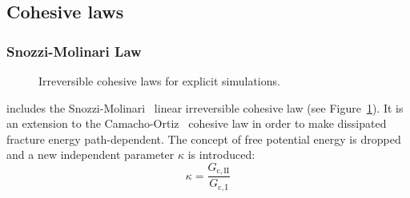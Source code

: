 \subsection{Cohesive laws}
\label{sec:cohesive-laws}

\subsubsection{Snozzi-Molinari Law}
\begin{figure}[!hbt]
  \centering
  \qquad
  \caption{Irreversible cohesive laws for explicit simulations.}
  \label{fig:smm:coh:linear_cohesive_law}
\end{figure}

\akantu includes the Snozzi-Molinari~\cite{snozzi_cohesive_2013}
linear irreversible cohesive law (see
Figure~\ref{fig:smm:coh:linear_cohesive_law}). It is an extension to
the Camacho-Ortiz~\cite{camacho_computational_1996} cohesive law in
order to make dissipated fracture energy path-dependent. The concept
of free potential energy is dropped and a new independent parameter
$\kappa$ is introduced:
\begin{equation}
  \kappa = \frac{G_\mathrm{c, II}}{G_\mathrm{c, I}}
\end{equation}

